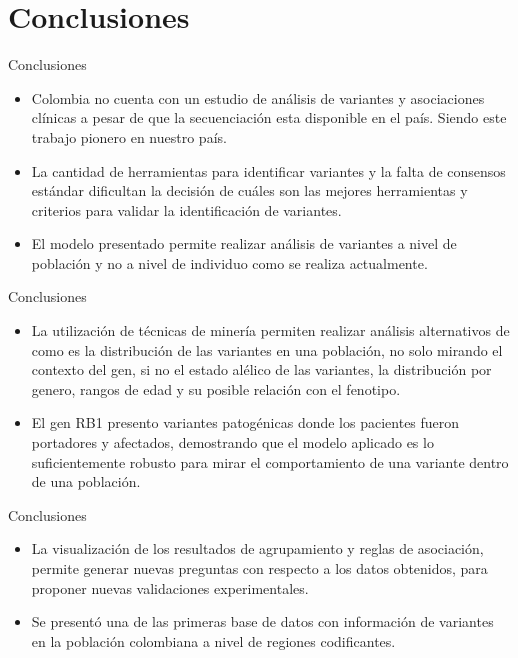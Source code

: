 \documentclass[xcolor=dvipsnames]{beamer}
\begin{document}
\section{Conclusiones}
\begin{frame}{Conclusiones}

    \begin{itemize}
    \justifying
    \item Colombia no cuenta con un estudio de análisis de variantes y asociaciones clínicas a pesar de que la secuenciación esta disponible en el país. Siendo este trabajo pionero en nuestro país.
    
    \item La cantidad de herramientas para identificar variantes y la falta de consensos estándar dificultan la decisión de cuáles son las mejores herramientas y criterios para validar la identificación de variantes.
    
    \item El modelo presentado permite realizar análisis de variantes a nivel de población y no a nivel de individuo como se realiza actualmente. 
    \end{itemize}
  
\end{frame}

\begin{frame}{Conclusiones}
\begin{itemize}
    \justifying
    \item La utilización de técnicas de minería permiten realizar análisis alternativos de como es la distribución de las variantes en una población, no solo mirando el contexto del gen, si no el estado alélico de las variantes, la distribución por genero, rangos de edad y su posible relación con el fenotipo.
    
    \item El gen RB1 presento variantes patogénicas donde los pacientes fueron portadores y afectados, demostrando que el modelo aplicado es lo suficientemente robusto para mirar el comportamiento de una variante dentro de una población.
\end{itemize}    
    
\end{frame}

\begin{frame}{Conclusiones}
\begin{itemize}
    \justifying
    \item La visualización de los resultados de agrupamiento  y reglas de asociación, permite generar nuevas preguntas con respecto a los datos obtenidos, para proponer nuevas validaciones experimentales.
	
	\item Se presentó una de las primeras base de datos con información de variantes en la población colombiana a nivel de regiones codificantes.
\end{itemize}	
\end{frame}
\end{document}
